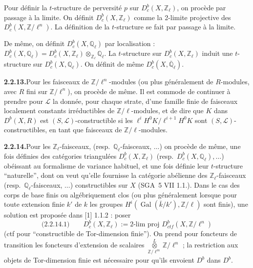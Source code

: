 \documentclass[12pt,a4paper]{article}
\theoremstyle{plain}
\theoremstyle{definition}
\DeclareMathOperator{\Gal}{Gal}
\begin{document}
Pour d\'efinir la $t$-structure de perversit\'e $p$ sur $D_c^b(X, \mathbb{Z}_\ell)$, on proc\`ede par passage \`a la limite. On d\'efinit $D_c^b(X, \mathbb{Z}_\ell)$ comme la 2-limite projective des $D_c^b(X, \mathbb{Z}/\ell^n)$. La d\'efinition de la $t$-structure se fait par passage \`a la limite.

De m\^eme, on d\'efinit $D_c^b(X, \mathbb{Q}_\ell)$ par localisation : $D_c^b(X, \mathbb{Q}_\ell) = D_c^b(X, \mathbb{Z}_\ell) \otimes_{\mathbb{Z}_\ell} \mathbb{Q}_\ell$. La $t$-structure sur $D_c^b(X, \mathbb{Z}_\ell)$ induit une $t$-structure sur $D_c^b(X, \mathbb{Q}_\ell)$. On d\'efinit de m\^eme $D_c^b(X, \overline{\mathbb{Q}}_\ell)$.

\smallskip
\noindent\textbf{2.2.13.}\quad Pour les faisceaux de $\mathbb{Z}/\ell^n$-modules (ou plus g\'en\'eralement de $R$-modules, avec $R$ fini sur $\mathbb{Z}/\ell^n$), on proc\`ede de m\^eme. Il est commode de continuer \`a prendre pour $\mathcal{L}$ la donn\'ee, pour chaque strate, d'une famille finie de faisceaux localement constants irr\'eductibles de $\mathbb{Z}/\ell$-modules, et de dire que $K$ dans $D^b(X, R)$ est $(S, \mathcal{L})$-constructible si les $\ell^i H^0 K / \ell^{i+1} H^0 K$ sont $(S, \mathcal{L})$-constructibles, en tant que faisceaux de $\mathbb{Z}/\ell$-modules.

\smallskip
\noindent\textbf{2.2.14.}\quad Pour les $\mathbb{Z}_\ell$-faisceaux, (resp.\ $\mathbb{Q}_\ell$-faisceaux, $\ldots$) on proc\`ede de m\^eme, une fois d\'efinies des cat\'egories triangul\'ees $D_c^b(X, \mathbb{Z}_\ell)$ (resp.\ $D_c^b(X, \mathbb{Q}_\ell), \ldots$) ob\'eissant au formalisme de variance habituel, et une fois d\'efinie leur $t$-structure ``naturelle'', dont on veut qu'elle fournisse la cat\'egorie ab\'elienne des $\mathbb{Z}_\ell$-faisceaux (resp.\ $\mathbb{Q}_\ell$-faisceaux, $\ldots$) constructibles sur $X$ (SGA~5 VII 1.1.). Dans le cas des corps de base finis ou alg\'ebriquement clos (ou plus g\'en\'eralement lorsque pour toute extension finie $k'$ de $k$ les groupes $H^i(\Gal(\bar{k}/k'), \mathbb{Z}/\ell)$ sont finis), une solution est propos\'ee dans [1] 1.1.2 : poser
\[
\text{(2.2.14.1)}\qquad D_c^b(X, \mathbb{Z}_\ell) := \text{2-lim proj } D_{ctf}^b(X, \mathbb{Z}/\ell^n)
\]
(ctf pour ``constructible de Tor-dimension finie''). On prend pour foncteurs de transition les foncteurs d'extension de scalaires $\overset{L}{\underset{\mathbb{Z}/\ell^m}{\otimes}} \mathbb{Z}/\ell^n$ ; la restriction aux objets de Tor-dimension finie est n\'ecessaire pour qu'ils envoient $D^b$ dans $D^b$.
\end{document}
